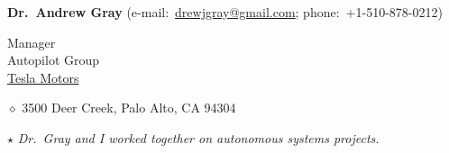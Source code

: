 \textbf{Dr.~Andrew Gray}
(e-mail:~\href{mailto:drewjgray@gmail.com}{drewjgray@gmail.com}; phone:~+1-510-878-0212)
\begin{innerlist}
	\item Manager\\
		Autopilot Group\\
		\href{http://www.teslamotors.com/}{Tesla Motors}
	\item[$\diamond$] 3500 Deer Creek, Palo Alto, CA 94304
	\item[$\star$] \emph{Dr.~Gray and I worked together on autonomous systems projects.}
\end{innerlist}